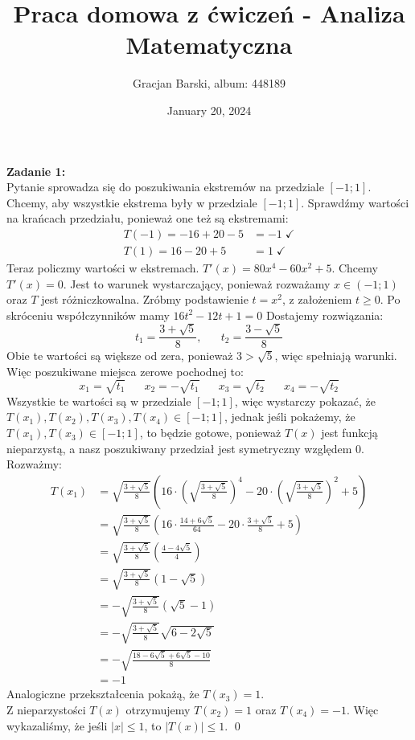 \documentclass[10pt]{article}
\title{{\bf Praca domowa z ćwiczeń - Analiza Matematyczna }}
\author{Gracjan Barski, album: 448189}
\date{January 20, 2024}
\begin{document}
\maketitle
\textbf{Zadanie 1:} \\[10pt]
Pytanie sprowadza się do poszukiwania ekstremów na przedziale $[-1;1]$. Chcemy, aby wszystkie ekstrema były w przedziale $[-1;1]$. Sprawdźmy wartości na krańcach przedziału, ponieważ one też są ekstremami:
\begin{align*}
    T(-1) = -16 + 20 - 5 &= -1 \; \checkmark \\
    T(1) = 16 - 20 + 5 &= 1 \; \checkmark 
\end{align*}
Teraz policzmy wartości w ekstremach.
$T'(x) = 80x^4 - 60x^2 + 5$. Chcemy $T'(x) = 0$. Jest to warunek wystarczający, ponieważ rozważamy $x \in (-1; 1)$ oraz $T$ jest różniczkowalna. Zróbmy podstawienie $t = x^2$, z założeniem $t \geq 0$. Po skróceniu współczynników mamy $16t^2 - 12t + 1 = 0$ Dostajemy rozwiązania:
$$t_1 = \frac{3 + \sqrt{5}}{8}, \hspace{20pt} t_2 = \frac{3 - \sqrt{5}}{8}$$
Obie te wartości są większe od zera, ponieważ $3 > \sqrt{5}$, więc spełniają warunki. Więc poszukiwane miejsca zerowe pochodnej to:
$$x_1 = \sqrt{t_1} \hspace{20pt}  x_2 = -\sqrt{t_1} \hspace{20pt} x_3 = \sqrt{t_2} \hspace{20pt} x_4 = -\sqrt{t_2}$$
Wszystkie te wartości są w przedziale $[-1;1]$, więc wystarczy pokazać, że $T(x_1), T(x_2), T(x_3), T(x_4) \in [-1; 1]$, jednak jeśli pokażemy, że $T(x_1), T(x_3) \in [-1; 1]$, to będzie gotowe, ponieważ $T(x)$ jest funkcją nieparzystą, a nasz poszukiwany przedział jest symetryczny względem 0. \\[5pt]
Rozważmy:
\begin{align*}
    T(x_1) &= \sqrt{\frac{3 + \sqrt{5}}{8}} \left(16 \cdot \left(\sqrt{\frac{3 + \sqrt{5}}{8}}\right)^4 - 20 \cdot \left(\sqrt{\frac{3 + \sqrt{5}}{8}}\right)^2 + 5\right) \\
    &= \sqrt{\frac{3 + \sqrt{5}}{8}} \left(16 \cdot \frac{14 + 6\sqrt{5}}{64} - 20 \cdot \frac{3 + \sqrt{5}}{8} + 5\right) \\
    &= \sqrt{\frac{3 + \sqrt{5}}{8}} \left(\frac{4 - 4\sqrt{5}}{4}\right) \\
    &= \sqrt{\frac{3 + \sqrt{5}}{8}} \left(1 - \sqrt{5}\right) \\
    &= -\sqrt{\frac{3 + \sqrt{5}}{8}} \left(\sqrt{5} - 1\right) \\
    &= -\sqrt{\frac{3 + \sqrt{5}}{8}} \sqrt{6 - 2\sqrt{5}} \\
    &= -\sqrt{\frac{18 - 6\sqrt{5} + 6\sqrt{5} - 10}{8}} \\
    &= -1
\end{align*} 
Analogiczne przekształcenia pokażą, że $T(x_3) = 1$. \\[5pt]
Z nieparzystości $T(x)$ otrzymujemy $T(x_2) = 1$ oraz $T(x_4) = -1$. Więc wykazaliśmy, że jeśli $|x| \leq 1$, to $|T(x)| \leq 1$. \qed
\end{document}
